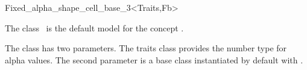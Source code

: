 
\begin{ccRefClass}{Fixed_alpha_shape_cell_base_3<Traits,Fb>}

\ccDefinition

The class \ccRefName\ is the default  model for the concept
.

The class has two parameters. The traits class 
provides the number type for alpha values.
The second parameter  is a base class instantiated by default
with . 



\ccIsModel
{}

\ccInheritsFrom



\end{ccRefClass}

